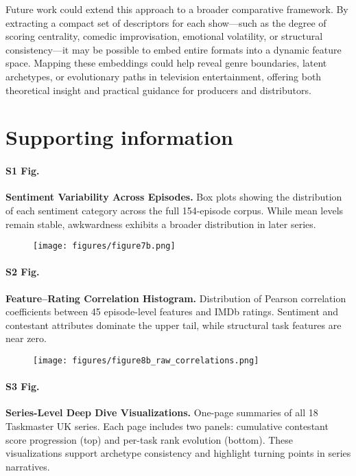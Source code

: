 \documentclass[10pt,letterpaper]{article}
\begin{document}
Future work could extend this approach to a broader comparative framework. By extracting a compact set of descriptors for each show—such as the degree of scoring centrality, comedic improvisation, emotional volatility, or structural consistency—it may be possible to embed entire formats into a dynamic feature space. Mapping these embeddings could help reveal genre boundaries, latent archetypes, or evolutionary paths in television entertainment, offering both theoretical insight and practical guidance for producers and distributors.





\section*{Supporting information}

\paragraph*{S1 Fig.}
\label{S1_Fig}
{\bf Sentiment Variability Across Episodes.} 
Box plots showing the distribution of each sentiment category across the full 154-episode corpus. While mean levels remain stable, awkwardness exhibits a broader distribution in later series.

\begin{figure}[!h]
\centering
\texttt{[image: figures/figure7b.png]}
\end{figure}
\FloatBarrier

\paragraph*{S2 Fig.}
\label{S2_Fig}
{\bf Feature–Rating Correlation Histogram.} 
Distribution of Pearson correlation coefficients between 45 episode-level features and IMDb ratings. Sentiment and contestant attributes dominate the upper tail, while structural task features are near zero.

\begin{figure}[!h]
\centering
\texttt{[image: figures/figure8b\_raw\_correlations.png]}
\end{figure}
\FloatBarrier

\paragraph*{S3 Fig.}
\label{S3_Fig}
{\bf Series-Level Deep Dive Visualizations.}
One-page summaries of all 18 Taskmaster UK series. Each page includes two panels: cumulative contestant score progression (top) and per-task rank evolution (bottom). These visualizations support archetype consistency and highlight turning points in series narratives.
\end{document}
